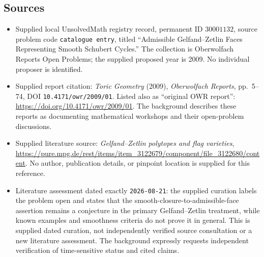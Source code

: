 \documentclass[11pt]{article}
\begin{document}
\subsection{Sources}
\begin{itemize}
\item Supplied local UnsolvedMath registry record, permanent ID \(30001132\), source problem code \texttt{catalogue entry}, titled ``Admissible Gelfand--Zetlin Faces Representing Smooth Schubert Cycles.'' The collection is Oberwolfach Reports Open Problems; the supplied proposed year is 2009. No individual proposer is identified.
\item Supplied report citation: \emph{Toric Geometry} (2009), \emph{Oberwolfach Reports}, pp.~5--74, DOI \texttt{10.4171/owr/2009/01}. Listed also as ``original OWR report'': \url{https://doi.org/10.4171/owr/2009/01}. The background describes these reports as documenting mathematical workshops and their open-problem discussions.
\item Supplied literature source: \emph{Gelfand--Zetlin polytopes and flag varieties}, \url{https://pure.mpg.de/rest/items/item_3122679/component/file_3122680/content}. No author, publication details, or pinpoint location is supplied for this reference.
\item Literature assessment dated exactly \texttt{2026-08-21}: the supplied curation labels the problem open and states that the smooth-closure-to-admissible-face assertion remains a conjecture in the primary Gelfand--Zetlin treatment, while known examples and smoothness criteria do not prove it in general. This is supplied dated curation, not independently verified source consultation or a new literature assessment. The background expressly requests independent verification of time-sensitive status and cited claims.
\end{itemize}
\end{document}
